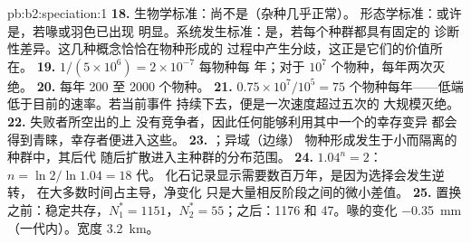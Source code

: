 \begin{solution}{pb:b2:speciation:1}
\textbf{18.} 生物学标准：尚不是（杂种几乎正常）。
形态学标准：或许是，若喙或羽色已出现
明显。系统发生标准：是，若每个种群都具有固定的
诊断性差异。这几种概念恰恰在物种形成的
过程中产生分歧，这正是它们的价值所在。
\textbf{19.} $1/(5\times 10^{6}) = 2\times 10^{-7}$ 每物种每
年；对于 $10^{7}$ 个物种，每年两次灭绝。
\textbf{20.} 每年 200 至 2000 个物种。
\textbf{21.} $0.75\times 10^{7}/10^{5} = 75$ 个物种每年——低端
低于目前的速率。若当前事件
持续下去，便是一次速度超过五次的
大规模灭绝。
\textbf{22.} 失败者所空出的上
没有竞争者，因此任何能够利用其中一个的幸存变异
都会得到青睐，幸存者便进入这些。
\textbf{23.} ；异域（边缘）
物种形成发生于小而隔离的种群中，其后代
随后扩散进入主种群的分布范围。
\textbf{24.} $1.04^{n} = 2$：$n = \ln 2/\ln 1.04 = 18$ 代。
化石记录显示需要数百万年，是因为选择会发生逆转，
在大多数时间占主导，净变化
只是大量相反阶段之间的微小差值。
\textbf{25.} 置换之前：稳定共存，$N_1^{*} =
1151$，$N_2^{*} = 55$；之后：1176 和 47。喙的变化
\qty{-0.35}{mm}（一代内）。宽度 \qty{3.2}{km}。
\end{solution}
